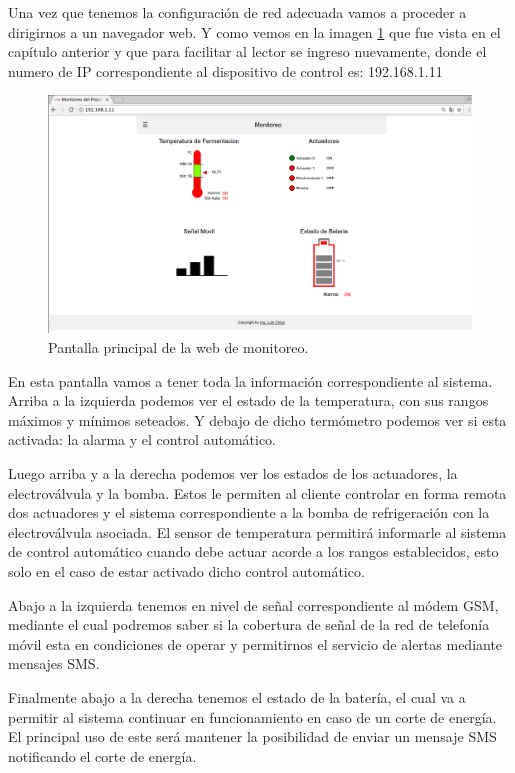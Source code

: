 Una vez que tenemos la configuración de red adecuada vamos a proceder a dirigirnos a un navegador web. Y como vemos en la imagen \ref{fig:web_monitoreo} que fue vista en el capítulo anterior y que para facilitar al lector se ingreso nuevamente, donde el numero de IP correspondiente al dispositivo de control es: 192.168.1.11 

\begin{figure}[h]
  \centering
  \includegraphics[scale=.25]{./Figures/web_monitoreo.png}
  \caption{Pantalla principal de la web de monitoreo.}
  \label{fig:web_monitoreo}
\end{figure}

En esta pantalla vamos a tener toda la información correspondiente al sistema. Arriba a la izquierda podemos ver el estado de la temperatura, con sus rangos máximos y mínimos seteados. Y debajo de dicho termómetro podemos ver si esta activada: la alarma y el control automático.

Luego arriba y a la derecha podemos ver los estados de los actuadores, la electroválvula y la bomba. Estos le permiten al cliente controlar en forma remota dos actuadores y el sistema correspondiente a la bomba de refrigeración con la electroválvula asociada. El sensor de temperatura permitirá informarle al sistema de control automático cuando debe actuar acorde a los rangos establecidos, esto solo en el caso de estar activado dicho control automático. 

Abajo a la izquierda tenemos en nivel de señal correspondiente al módem GSM, mediante el cual podremos saber si la cobertura de señal de la red de telefonía móvil esta en condiciones de operar y permitirnos el servicio de alertas mediante mensajes SMS. 

Finalmente abajo a la derecha tenemos el estado de la batería, el cual va a permitir al sistema continuar en funcionamiento en caso de un corte de energía. El principal uso de este será mantener la posibilidad de enviar un mensaje SMS notificando el corte de energía.

